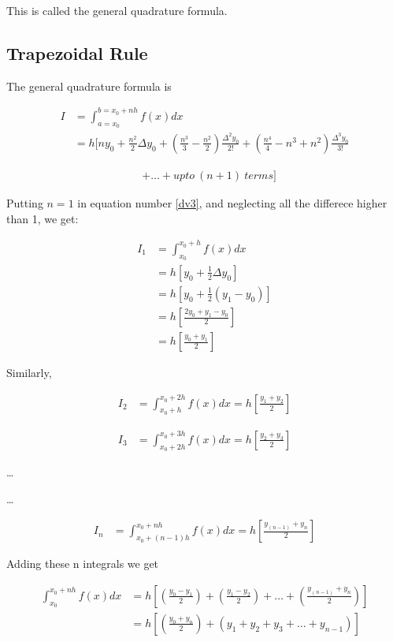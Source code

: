 \documentclass[11pt, a4paper]{article}
\begin{document}
This is called the general quadrature formula.

\subsection{Trapezoidal Rule}
The general quadrature formula is

\begin{align*}
  I &=\int_{a=x_0}^{b=x_0+nh}f(x)dx\\
    &= h[ny_0+\frac{n^2}{2}\Delta y_0+(\frac{n^3}{3}-\frac{n^2}{2})\frac{\Delta^2y_0}{2!}+(\frac{n^4}{4}-n^3+n^2)\frac{\Delta^3y_0}{3!}
\end{align*}

\begin{align}\label{dv3}
    &+ \dots+upto\ (n+1)\ terms]
\end{align}

Putting $n=1$ in equation number \ref{dv3}, and neglecting all the differece 
higher than 1, we get:

\begin{align*}
  I_1 &= \int_{x_0}^{x_0+h}f(x)dx\\
      &= h[y_0+\frac{1}{2}\Delta y_0]\\
      &= h[y_0+\frac{1}{2}(y_1-y_0)]\\
      &= h[\frac{2y_0+y_1-y_0}{2}]\\
      &= h[\frac{y_0+y_1}{2}]
\end{align*}

Similarly,

\begin{align*}
  I_2 &= \int_{x_0+h}^{x_0+2h}f(x)dx = h[\frac{y_1+y_2}{2}]
\end{align*}

\begin{align*}
  I_3 &= \int_{x_0+2h}^{x_0+3h}f(x)dx = h[\frac{y_2+y_3}{2}]
\end{align*}

\dots 

\dots 

\begin{align*}
  I_n &= \int_{x_0+(n-1)h}^{x_0+nh}f(x)dx = h[\frac{y_{(n-1)}+y_n}{2}]
\end{align*}

Adding these n integrals we get

\begin{align*}
  \int_{x_0}^{x_0+nh}f(x)dx &= h[(\frac{y_0-y_1}{2})+(\frac{y_1-y_2}{2})+\dots+(\frac{y_{(n-1)}+y_n}{2})]\\
                            &= h[(\frac{y_0+y_n}{2})+(y_1+y_2+y_3+\dots+y_{n-1})]
\end{align*}
\end{document}
